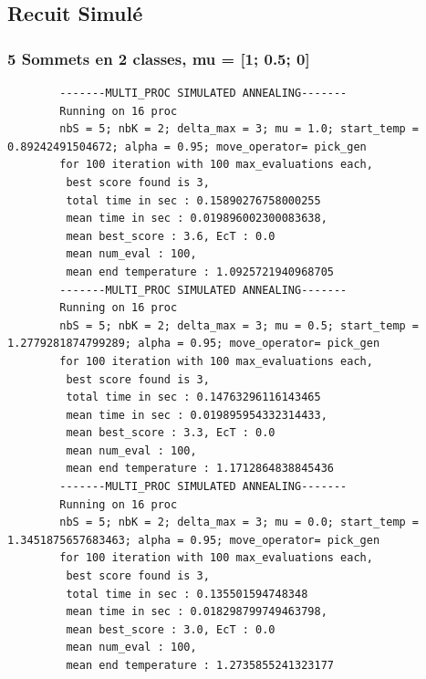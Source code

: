 \documentclass[a4paper]{article}
\begin{document}
	\subsection{Recuit Simulé}
		\subsubsection{5 Sommets en 2 classes, mu = [1; 0.5; 0]}
		\begin{verbatim}
		-------MULTI_PROC SIMULATED ANNEALING-------
		Running on 16 proc
		nbS = 5; nbK = 2; delta_max = 3; mu = 1.0; start_temp = 0.89242491504672; alpha = 0.95; move_operator= pick_gen
		for 100 iteration with 100 max_evaluations each, 
		 best score found is 3,
		 total time in sec : 0.15890276758000255
		 mean time in sec : 0.019896002300083638,
		 mean best_score : 3.6, EcT : 0.0
		 mean num_eval : 100,
		 mean end temperature : 1.0925721940968705
		-------MULTI_PROC SIMULATED ANNEALING-------
		Running on 16 proc
		nbS = 5; nbK = 2; delta_max = 3; mu = 0.5; start_temp = 1.2779281874799289; alpha = 0.95; move_operator= pick_gen
		for 100 iteration with 100 max_evaluations each, 
		 best score found is 3,
		 total time in sec : 0.14763296116143465
		 mean time in sec : 0.019895954332314433,
		 mean best_score : 3.3, EcT : 0.0
		 mean num_eval : 100,
		 mean end temperature : 1.1712864838845436
		-------MULTI_PROC SIMULATED ANNEALING-------
		Running on 16 proc
		nbS = 5; nbK = 2; delta_max = 3; mu = 0.0; start_temp = 1.3451875657683463; alpha = 0.95; move_operator= pick_gen
		for 100 iteration with 100 max_evaluations each, 
		 best score found is 3,
		 total time in sec : 0.135501594748348
		 mean time in sec : 0.018298799749463798,
		 mean best_score : 3.0, EcT : 0.0
		 mean num_eval : 100,
		 mean end temperature : 1.2735855241323177
		\end{verbatim}
\end{document}
